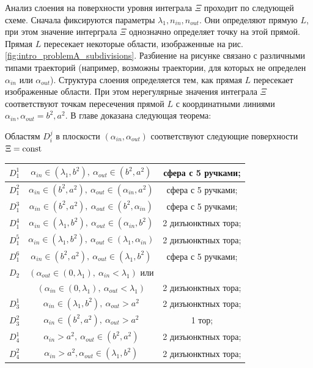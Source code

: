 Анализ слоения на поверхности уровня интеграла $\Xi$ проходит по следующей схеме. Сначала фиксируются параметры $\lambda_1, n_{in}, n_{out}$. Они определяют прямую $L$, при этом значение интерграла $\Xi$ однозначно определяет точку на этой прямой. Прямая $L$ пересекает некоторые области, изображенные на рис. \ref{fig:intro_problemA_subdivisions}. Разбиение на рисунке связано с различными типами траекторий (например, возможны траектории, для которых не определен $\alpha_{in}$ или $\alpha_{out}$).
Структура слоения определяется тем, как прямая $L$ пересекает изображенные области.
При этом нерегулярные значения интеграла $\Xi$ соответствуют точкам пересечения прямой $L$ с координатными линиями $\alpha_{in}, \alpha_{out} = b^2, a^2$. 
В главе доказана следующая теорема:
\begin{theorem} 
Областям $D_i^j$ в плоскости $(\alpha_{in}, \alpha_{out})$ соответствуют следующие поверхности $\Xi = \mathrm{const}$
\medskip
\begin{center}
\begin{tabular}{|c|c|c|}
\hline 
$D_1^1$  	& 	$\alpha_{in} \in (\lambda_1, b^2), \ \alpha_{out} \in (b^2, a^2)$			& сфера с 5 ручками; \\ \hline 
$D_1^2$  	& 	$\alpha_{in} \in (b^2, a^2), \ \alpha_{out} \in (\alpha_{in}, a^2)$				& сфера с 5 ручками; \\ \hline 
$D_1^3$  	& 	$\alpha_{in} \in (b^2, a^2), \ \alpha_{out} \in (b^2, \alpha_{in})$				& сфера с 5 ручками; \\ \hline 
$D_1^4$ 	& 	$\alpha_{in} \in (\lambda_1, b^2), \ \alpha_{out} \in (\alpha_{in}, b^2)$	& 2 дизъюнктных тора; \\ \hline 
$D_1^5$  	& 	$\alpha_{in} \in (\lambda_1, b^2), \ \alpha_{out} \in (\lambda_1, \alpha_{in})$	& 2 дизъюнктных тора; \\ \hline 
$D_1^6$  	& 	$\alpha_{in} \in (b^2, a^2), \ \alpha_{out} \in (\lambda_1, b^2)$			& сфера с 5 ручками; \\ \hline 
\hline
$D_2$  	& 	$(\alpha_{out} \in (0, \lambda_1), \ \alpha_{in} < \lambda_1)$ или & \\
		&  $(\alpha_{in} \in (0, \lambda_1), \ \alpha_{out} < \lambda_1)$				& 2 дизъюнктных тора; \\ \hline
 \hline
$D_3^1$  	& 	$\alpha_{in} \in (\lambda_1, b^2), \ \alpha_{out} > a^2$				& 2 дизъюнктных тора; \\ \hline 
$D_3^2$  	& 	$\alpha_{in} \in (b^2, a^2), \ \alpha_{out} > a^2 $					& 1 тор; \\ \hline 
\hline 
$D_4^1$  	& 	$\alpha_{in} > a^2, \ \alpha_{out} \in (b^2, a^2)$						& 2 дизъюнктных тора; \\ \hline 
$D_4^2$  	& 	$\alpha_{in} > a^2, \alpha_{out} \in (\lambda_1, b^2)$				& 2 дизъюнктных тора; \\ \hline 
\end{tabular}
\end{center}
\label{st:intron1_n2_surfaces}
\end{theorem} 
